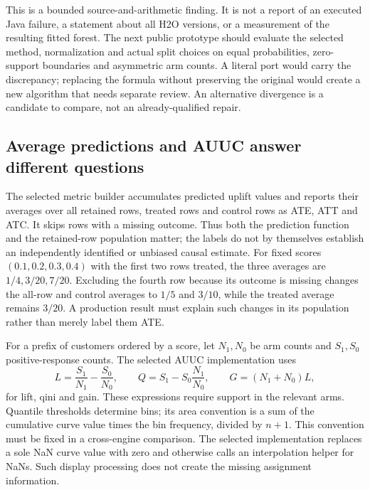 This is a bounded source-and-arithmetic finding. It is not a report of an
executed Java failure, a statement about all H2O versions, or a measurement of
the resulting fitted forest. The next public prototype should evaluate the
selected method, normalization and actual split choices on equal probabilities,
zero-support boundaries and asymmetric arm counts. A literal port would carry
the discrepancy; replacing the formula without preserving the original would
create a new algorithm that needs separate review. An alternative divergence
is a candidate to compare, not an already-qualified repair.
\citep{exec20_javaeffects_h2o,exec20_javaeffects_reference}

\subsection{Average predictions and AUUC answer different questions}
\label{exec20:javafx-metrics}

The selected metric builder accumulates predicted uplift values and reports
their averages over all retained rows, treated rows and control rows as ATE,
ATT and ATC. It skips rows with a missing outcome. Thus both the prediction
function and the retained-row population matter; the labels do not by
themselves establish an independently identified or unbiased causal estimate.
For fixed scores $(0.1,0.2,0.3,0.4)$ with the first two rows treated, the
three averages are $1/4,3/20,7/20$. Excluding the fourth row because its
outcome is missing changes the all-row and control averages to $1/5$ and
$3/10$, while the treated average remains $3/20$. A production result must
explain such changes in its population rather than merely label them ATE.
\citep{exec20_javaeffects_h2o,exec20_javaeffects_reference}

For a prefix of customers ordered by a score, let $N_1,N_0$ be arm counts
and $S_1,S_0$ positive-response counts. The selected AUUC implementation uses
\begin{equation}
 L=\frac{S_1}{N_1}-\frac{S_0}{N_0},\qquad
 Q=S_1-S_0\frac{N_1}{N_0},\qquad
 G=(N_1+N_0)L,
 \label{exec20:javafx-curves}
\end{equation}
for lift, qini and gain. These expressions require support in the relevant
arms. Quantile thresholds determine bins; its area convention is a sum of
the cumulative curve value times the bin frequency, divided by $n+1$.
This convention must be fixed in a cross-engine comparison. The selected
implementation replaces a sole NaN curve value with zero and otherwise calls
an interpolation helper for NaNs. Such display processing does not create
the missing assignment information.
\citep{exec20_javaeffects_h2o}

